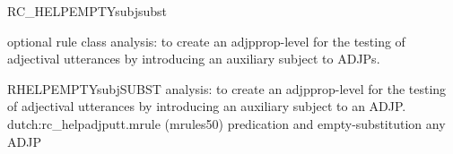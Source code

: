 \begin{mruleclass}{RC\_HELPEMPTYsubjsubst}
\begin{classdescr}
\kind optional rule class
\classtask analysis:
to create an adjpprop-level for the testing of adjectival utterances
 by 
introducing an auxiliary subject to ADJPs.
\classremarks

\nofilters

\nospeedrules

\noplannedrules

\norulesnotince


\end{classdescr}

\begin{members}
\begin{member}
 RHELPEMPTYsubjSUBST
 analysis: 
to create an adjpprop-level for the testing of adjectival utterances
 by 
introducing an auxiliary subject to an ADJP.
\file dutch:rc\_helpadjputt.mrule (mrules50)
\semantics predication and empty-substitution
\example any ADJP
\remarks\mbox{}
\end{member}
\end{members}
\end{mruleclass}


